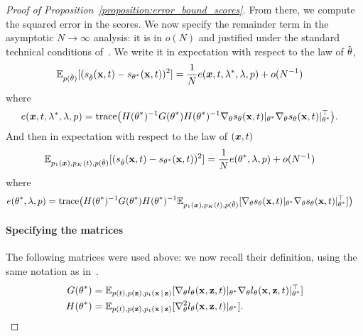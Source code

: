 \begin{proof}[Proof of Proposition~\ref{proposition:error_bound_scores}]
From there, we compute the squared error in the scores. We now specify the remainder term in the asymptotic $N \rightarrow \infty$ analysis: it is in $o(N)$ and justified  under the standard  technical conditions of~\citet[Th. 5.23]{vandervaart2000asympstats}. We write it in expectation with respect to the law of $\hat{\operatorname{\mathbf{\theta}}}$, 
\begin{align}
\mathbb{E}_{p(\hat{\operatorname{\mathbf{\theta}}})}[
(s_{\hat{\operatorname{\mathbf{\theta}}}}(\operatorname{\mathbf{x}}, t) - s_{\operatorname{\mathbf{\theta}}^*}(\operatorname{\mathbf{x}}, t))^2
]
&=
\frac{1}{N}
e({\bm{x}}, t, \lambda^*, \lambda, p)
+
o(N^{-1})
\end{align}
where
\begin{align}
\label{eq:squared_score_error}
e(\vx, t, \lambda^*, \lambda, p)
&=
\mathrm{trace} \big(
H(\btheta^*)^{-1}
G(\btheta^*) 
H(\btheta^*)^{-1}
\nabla_{\btheta} s_{\btheta}(\bx, t)|_{\btheta^*}
\nabla_{\btheta} s_{\btheta}(\bx, t)|_{\btheta^*}^\top
\big).
\end{align}
And then in expectation with respect to the law of $({\bm{x}}, t)$
\begin{align}
&\mathbb{E}_{p_1({\bm{x}}), p_K(t), p(\hat{\operatorname{\mathbf{\theta}}})}[
(s_{\hat{\operatorname{\mathbf{\theta}}}}(\operatorname{\mathbf{x}}, t) - s_{\operatorname{\mathbf{\theta}}^*}(\operatorname{\mathbf{x}}, t))^2
]
=
\frac{1}{N} e(\operatorname{\mathbf{\theta}}^*, \lambda, p)
+
o(N^{-1})
\end{align}
where
\begin{align}
\label{eq:expected_squared_score_error}
    e(\btheta^*, \lambda, p)
    &=
    \mathrm{trace} \big(
    H(\btheta^*)^{-1}
    G(\btheta^*) 
    H(\btheta^*)^{-1}
    \E_{p_1(\vx), p_K(t), p(\hat{\btheta})}[
    \nabla_{\btheta} s_{\btheta}(\bx, t)|_{\btheta^*}
    \nabla_{\btheta} s_{\btheta}(\bx, t)|_{\btheta^*}^\top
    ]
    \big)
\end{align}


\paragraph{Specifying the matrices}
The following matrices were used above: we now recall their definition, using the same notation as in~\citet[Section 4.7]{bach2024learningtheorybook}.
\begin{align}
    G(\operatorname{\mathbf{\theta}}^*)
    &=
    \mathbb{E}_{p(t),p(\operatorname{\mathbf{z}}),p_{t}(\operatorname{\mathbf{x}}|\operatorname{\mathbf{z}})} [
    \nabla_{\operatorname{\mathbf{\theta}}} l_{\operatorname{\mathbf{\theta}}}(\operatorname{\mathbf{x}}, \operatorname{\mathbf{z}}, t)|_{\operatorname{\mathbf{\theta}}^*}
    \nabla_{\operatorname{\mathbf{\theta}}} l_{\operatorname{\mathbf{\theta}}}(\operatorname{\mathbf{x}}, \operatorname{\mathbf{z}}, t)|_{\operatorname{\mathbf{\theta}}^*}^\top
    ]
    \\
    H(\operatorname{\mathbf{\theta}}^*)
    &=
    \mathbb{E}_{p(t),p(\operatorname{\mathbf{z}}),p_{t}(\operatorname{\mathbf{x}}|\operatorname{\mathbf{z}})} [
    \nabla^2_{\operatorname{\mathbf{\theta}}} l_{\operatorname{\mathbf{\theta}}}(\operatorname{\mathbf{x}}, \operatorname{\mathbf{z}}, t)|_{\operatorname{\mathbf{\theta}}^*}
    ].
\end{align}


\end{proof}
